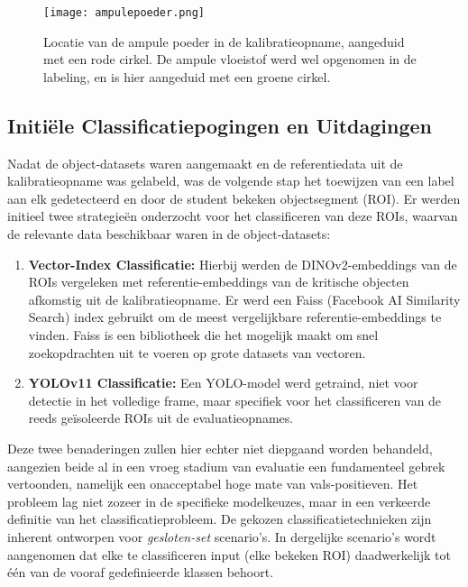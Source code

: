 \begin{figure}[H]
    \centering
    \texttt{[image: ampulepoeder.png]}
    \caption[Voorbeeld van de ampule poeder in de kalibratieopname]{
        \label{fig:ampulepoeder}
        Locatie van de ampule poeder in de kalibratieopname, aangeduid met een rode cirkel.
        De ampule vloeistof werd wel opgenomen in de labeling, en is hier aangeduid met een groene cirkel.
    }
\end{figure}

\subsection{Initiële Classificatiepogingen en Uitdagingen}

Nadat de object-datasets waren aangemaakt en de referentiedata uit de kalibratieopname was gelabeld, was de volgende stap het 
toewijzen van een label aan elk gedetecteerd en door de student bekeken objectsegment (ROI). 
Er werden initieel twee strategieën onderzocht voor het classificeren van deze ROIs, waarvan de relevante data beschikbaar waren in de object-datasets:
\begin{enumerate}
    \item \textbf{Vector-Index Classificatie:} Hierbij werden de DINOv2-embeddings van de ROIs vergeleken met referentie-embeddings van de kritische objecten afkomstig uit de kalibratieopname.
    Er werd een Faiss (Facebook AI Similarity Search) index gebruikt om de meest vergelijkbare referentie-embeddings te vinden.
    Faiss is een bibliotheek die het mogelijk maakt om snel zoekopdrachten uit te voeren op grote datasets van vectoren.
    \item \textbf{YOLOv11 Classificatie:} Een YOLO-model werd getraind, niet voor detectie in het volledige frame, maar specifiek voor het classificeren van de reeds 
    geïsoleerde ROIs uit de evaluatieopnames.
\end{enumerate}

Deze twee benaderingen zullen hier echter niet diepgaand worden behandeld, 
aangezien beide al in een vroeg stadium van evaluatie een fundamenteel gebrek vertoonden, 
namelijk een onacceptabel hoge mate van vals-positieven. 
Het probleem lag niet zozeer in de specifieke modelkeuzes, maar in een verkeerde definitie van het classificatieprobleem.
De gekozen classificatietechnieken zijn inherent ontworpen voor \textit{gesloten-set} scenario's. 
In dergelijke scenario's  wordt aangenomen dat elke te classificeren input (elke bekeken ROI)
daadwerkelijk tot één van de vooraf gedefinieerde klassen behoort. 

